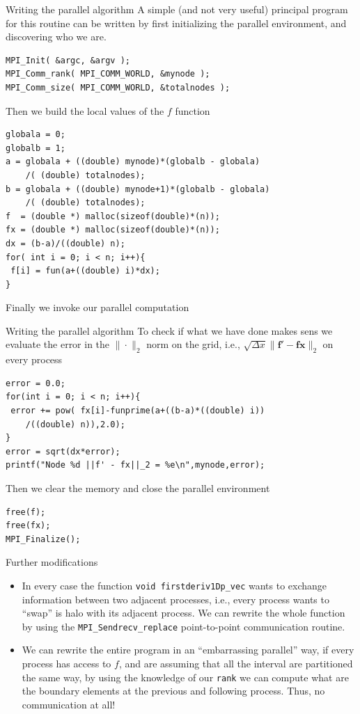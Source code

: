 \documentclass[xcolor={svgnames,usenames}]{beamer}
\begin{document}
\begin{frame}[fragile]{Writing the parallel algorithm}
\footnotesize
A simple (and not very useful) principal program for this routine can be written by first initializing the parallel environment, and discovering who we are.
\begin{verbatim}
MPI_Init( &argc, &argv );
MPI_Comm_rank( MPI_COMM_WORLD, &mynode );
MPI_Comm_size( MPI_COMM_WORLD, &totalnodes );
\end{verbatim}
Then we build the local values of the $f$ function
\begin{verbatim}
globala = 0;
globalb = 1;
a = globala + ((double) mynode)*(globalb - globala)
	/( (double) totalnodes);
b = globala + ((double) mynode+1)*(globalb - globala)
	/( (double) totalnodes);
f  = (double *) malloc(sizeof(double)*(n));
fx = (double *) malloc(sizeof(double)*(n));
dx = (b-a)/((double) n);
for( int i = 0; i < n; i++){
 f[i] = fun(a+((double) i)*dx);
}
\end{verbatim}
Finally we invoke our parallel computation
\end{frame}

\begin{frame}[fragile]{Writing the parallel algorithm}
To check if what we have done makes sens we evaluate the error in the $\|\cdot\|_2$ norm on the grid, i.e., $\sqrt{\Delta x} \| \mathbf{f}' - \mathbf{fx}\|_2$ on every process
\begin{verbatim}
error = 0.0;
for(int i = 0; i < n; i++){
 error += pow( fx[i]-funprime(a+((b-a)*((double) i))
 	/((double) n)),2.0);
}
error = sqrt(dx*error);
printf("Node %d ||f' - fx||_2 = %e\n",mynode,error);
\end{verbatim}
Then we clear the memory and close the parallel environment
\begin{verbatim}
free(f);
free(fx);
MPI_Finalize();
\end{verbatim}
\end{frame}

\begin{frame}{Further modifications}
\begin{itemize}
	\item In every case the function \texttt{void firstderiv1Dp_vec} wants to exchange
	information between two adjacent processes, i.e., every process wants to ``swap'' is halo with its adjacent process. We can rewrite the whole function by using the \texttt{MPI_Sendrecv_replace} point-to-point communication routine.
	\item We can rewrite the entire program in an ``embarrassing parallel'' way, if every process has access to $f$, and are assuming that all the interval are partitioned the same way, by using the knowledge of our \texttt{rank} we can compute what are the boundary elements at the previous and following process. Thus, no communication at all!
\end{itemize}
\vfill
{}
\end{frame}
\end{document}
